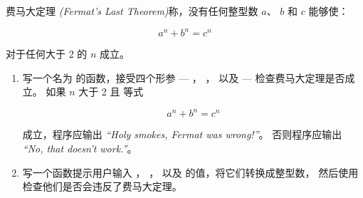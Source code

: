 {{{{\begin{exercise}

%

费马大定理 {\em (Fermat’s Last Theorem)}称，没有任何整型数 $a$、 $b$ 和 $c$ 能够使：

\[ a^n + b^n = c^n \]

对于任何大于 2 的 $n$ 成立。

\begin{enumerate}


\[a^n + b^n = c^n \]

%

\item 写一个名为 {\em {}} 的函数，接受四个形参 --- {\em {}}， {\em {}}， {\em {}} 以及 {\em {}} --- 检查费马大定理是否成立。 如果 {\em $n$} 大于 2 且 等式

\[a^n + b^n = c^n \]

成立，程序应输出 {\em ``Holy smokes, Fermat was wrong!''}。 否则程序应输出 {\em ``No, that doesn’t work.''}。


\item 写一个函数提示用户输入 {\em {}}， {\em {}}， {\em {}}以及 {\em {}} 的值，将它们转换成整型数， 然后使用 {\em {}} 检查他们是否会违反了费马大定理。

\end{enumerate}

\end{exercise}


\begin{exercise}



\end{exercise}}}}}
